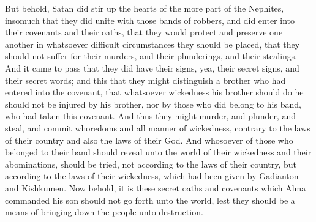 But behold, Satan did stir up the hearts of the more part of the Nephites, insomuch that they did unite with those bands of robbers, and did enter into their covenants and their oaths, that they would protect and preserve one another in whatsoever difficult circumstances they should be placed, that they should not suffer for their murders, and their plunderings, and their stealings.
\bverse \iffalse And it came to pass that they did have their signs, yea, their secret signs, and their secret words; and this that they might distinguish a brother who had entered into the covenant, that whatsoever wickedness his brother should do he should not be injured by his brother, nor by those who did belong to his band, who had taken this covenant. \fi
And it came to pass that they did have their signs, yea, their secret signs, and their secret words; and this that they might distinguish a brother who had entered into the covenant, that whatsoever wickedness his brother should do he should not be injured by his brother, nor by those who did belong to his band, who had taken this covenant.
\bverse \iffalse And thus they might murder, and plunder, and steal, and commit whoredoms and all manner of wickedness, contrary to the laws of their country and also the laws of their God. \fi
And thus they might murder, and plunder, and steal, and commit whoredoms and all manner of wickedness, contrary to the laws of their country and also the laws of their God.
\bverse \iffalse And whosoever of those who belonged to their band should reveal unto the world of their wickedness and their abominations, should be tried, not according to the laws of their country, but according to the laws of their wickedness, which had been given by Gadianton and Kishkumen. \fi
And whosoever of those who belonged to their band should reveal unto the world of their wickedness and their abominations, should be tried, not according to the laws of their country, but according to the laws of their wickedness, which had been given by Gadianton and Kishkumen.
\bverse \iffalse Now behold, it is these secret oaths and covenants which Alma commanded his son should not go forth unto the world, lest they should be a means of bringing down the people unto destruction. \fi
Now behold, it is these secret oaths and covenants which Alma commanded his son should not go forth unto the world, lest they should be a means of bringing down the people unto destruction.
\bverse \iffalse Now behold, those secret oaths and covenants did not come forth unto Gadianton from the records which were delivered unto Helaman; but behold, they were put into the heart of Gadianton by that same being who did entice our first parents to partake of the forbidden fruit-- \fi
